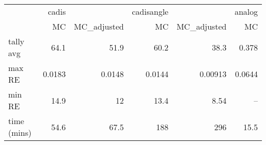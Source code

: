 \begin{tabular}{lrrrrr}
\toprule
{} &  cadis &             & cadisangle &             & analog \\
{} &     MC & MC\_adjusted &         MC & MC\_adjusted &     MC \\
\midrule
tally avg   &   64.1 &        51.9 &       60.2 &        38.3 &  0.378 \\
max RE      & 0.0183 &      0.0148 &     0.0144 &     0.00913 & 0.0644 \\
min RE      &   14.9 &          12 &       13.4 &        8.54 &    -- \\
time (mins) &   54.6 &        67.5 &        188 &         296 &   15.5 \\
\bottomrule
\end{tabular}
